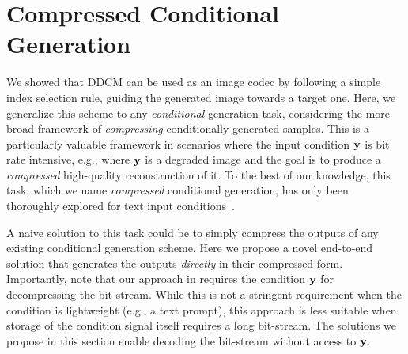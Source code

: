 \section{Compressed Conditional Generation}\label{sec:compressed_conditional_generation}

We showed that DDCM can be used as an image codec by following a simple index selection rule, guiding the generated image towards a target one.
Here, we generalize this scheme to any \emph{conditional} generation task, considering the more broad framework of \emph{compressing} conditionally generated samples.
This is a particularly valuable framework in scenarios where the input condition ${\mathbf{y}}$ is bit rate intensive, e.g., where ${\mathbf{y}}$ is a degraded image and the goal is to produce a \emph{compressed} high-quality reconstruction of it.
To the best of our knowledge, this task, which we name \emph{compressed} conditional generation, has only been thoroughly explored for text input conditions~\citep{bulla2023}.

A naive solution to this task could be to simply compress the outputs of any existing conditional generation scheme.
Here we propose a novel end-to-end solution that generates the outputs \emph{directly} in their compressed form.
Importantly, note that our approach in  requires the condition ${\mathbf{y}}$ for decompressing the bit-stream.
While this is not a stringent requirement when the condition is lightweight (e.g., a text prompt), this approach is less suitable when storage of the condition signal itself requires a long bit-stream. 
The solutions we propose in this section enable decoding the bit-stream without access to ${\mathbf{y}}$.


